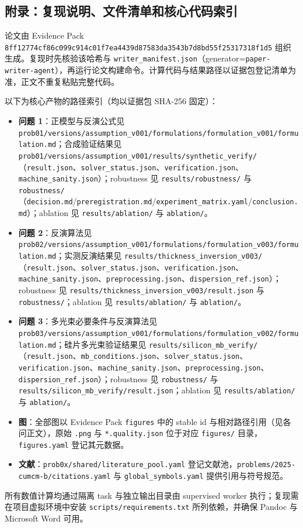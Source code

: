\subsection{附录：复现说明、文件清单和核心代码索引}\label{ux9644ux5f55ux590dux73b0ux8bf4ux660eux6587ux4ef6ux6e05ux5355ux548cux6838ux5fc3ux4ee3ux7801ux7d22ux5f15}

论文由 Evidence Pack
\texttt{8ff12774cf86c099c914c01f7ea4439d87583da3543b7d8bd55f25317318f1d5}
组织生成。复现时先核验该哈希与
\texttt{writer\_manifest.json}（generator=\texttt{paper-writer-agent}），再运行论文构建命令。计算代码与结果路径以证据包登记清单为准，正文不重复粘贴完整代码。

以下为核心产物的路径索引（均以证据包 SHA-256 固定）：

\begin{itemize}
\tightlist
\item
  \textbf{问题 1}：正模型与反演公式见
  \texttt{prob01/versions/assumption\_v001/formulations/formulation\_v001/formulation.md}；合成验证结果见
  \texttt{prob01/versions/assumption\_v001/results/synthetic\_verify/}（\texttt{result.json}、\texttt{solver\_status.json}、\texttt{verification.json}、\texttt{machine\_sanity.json}）；robustness
  见 \texttt{results/robustness/} 与
  \texttt{robustness/}（\texttt{decision.md}/\texttt{preregistration.md}/\texttt{experiment\_matrix.yaml}/\texttt{conclusion.md}）；ablation
  见 \texttt{results/ablation/} 与 \texttt{ablation/}。
\item
  \textbf{问题 2}：反演算法见
  \texttt{prob02/versions/assumption\_v001/formulations/formulation\_v003/formulation.md}；实测反演结果见
  \texttt{results/thickness\_inversion\_v003/}（\texttt{result.json}、\texttt{solver\_status.json}、\texttt{verification.json}、\texttt{machine\_sanity.json}、\texttt{preprocessing.json}、\texttt{dispersion\_ref.json}）；robustness
  见 \texttt{results/thickness\_inversion\_v003/result.json} 与
  \texttt{robustness/}；ablation 见 \texttt{results/ablation/} 与
  \texttt{ablation/}。
\item
  \textbf{问题 3}：多光束必要条件与反演算法见
  \texttt{prob03/versions/assumption\_v001/formulations/formulation\_v002/formulation.md}；硅片多光束验证结果见
  \texttt{results/silicon\_mb\_verify/}（\texttt{result.json}、\texttt{mb\_conditions.json}、\texttt{solver\_status.json}、\texttt{verification.json}、\texttt{machine\_sanity.json}、\texttt{preprocessing.json}、\texttt{dispersion\_ref.json}）；robustness
  见 \texttt{robustness/} 与
  \texttt{results/silicon\_mb\_verify/result.json}；ablation 见
  \texttt{results/ablation/} 与 \texttt{ablation/}。
\item
  \textbf{图}：全部图以 Evidence Pack \texttt{figures} 中的 stable id
  与相对路径引用（见各问正文），原始 \texttt{.png} 与
  \texttt{*.quality.json} 位于对应 \texttt{figures/}
  目录，\texttt{figures.yaml} 登记其元数据。
\item
  \textbf{文献}：\texttt{prob0x/shared/literature\_pool.yaml}
  登记文献池，\texttt{problems/2025-cumcm-b/citations.yaml} 与
  \texttt{global\_symbols.yaml} 提供引用与符号规范。
\end{itemize}

所有数值计算均通过隔离 task 与独立输出目录由 supervised worker
执行；复现需在项目虚拟环境中安装 \texttt{scripts/requirements.txt}
所列依赖，并确保 Pandoc 与 Microsoft Word 可用。
